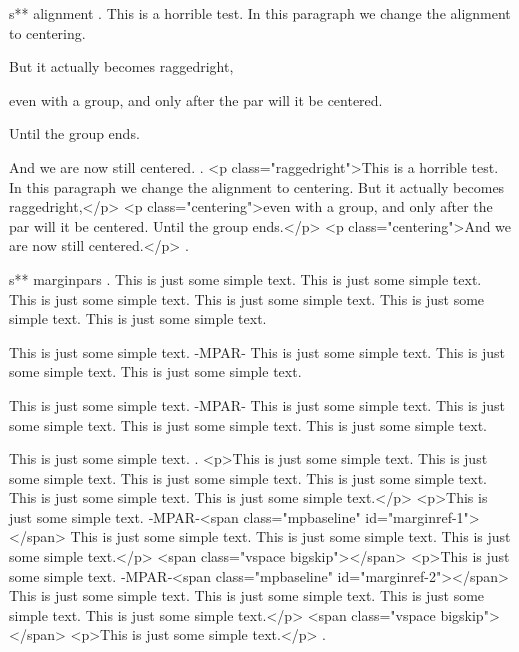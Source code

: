 s** alignment
.
This is a horrible test.
\centering
In this paragraph we change the alignment to centering.
{\raggedright But it actually becomes raggedright,

even with a group, and only after the par will it be centered.}
Until the group ends.

And we are now still centered.
.
<p class="raggedright">This is a horrible test. In this paragraph we change the alignment to centering. But it actually becomes raggedright,</p>
<p class="centering">even with a group, and only after the par will it be centered.​ Until the group ends.</p>
<p class="centering">And we are now still centered.</p>
.


s** marginpars
.
This is just some simple text. This is just some simple text.
This is just some simple text. This is just some simple text.
This is just some simple text. This is just some simple text.

This is just some simple text. -MPAR- This is just some simple text.
This is just some simple text. This is just some simple text.

\bigbreak

This is just some simple text. -MPAR- This is just some simple text. This is just some simple text.
This is just some simple text. This is just some simple text.

\bigbreak

This is just some simple text.
.
<p>This is just some simple text. This is just some simple text. This is just some simple text. This is just some simple text. This is just some simple text. This is just some simple text.</p>
<p>This is just some simple text. ‐MPAR‐<span class="mpbaseline" id="marginref-1"></span> This is just some simple text. This is just some simple text. This is just some simple text.</p>
<span class="vspace bigskip"></span>
<p>This is just some simple text. ‐MPAR‐<span class="mpbaseline" id="marginref-2"></span> This is just some simple text. This is just some simple text. This is just some simple text. This is just some simple text.</p>
<span class="vspace bigskip"></span>
<p>This is just some simple text.</p>
.